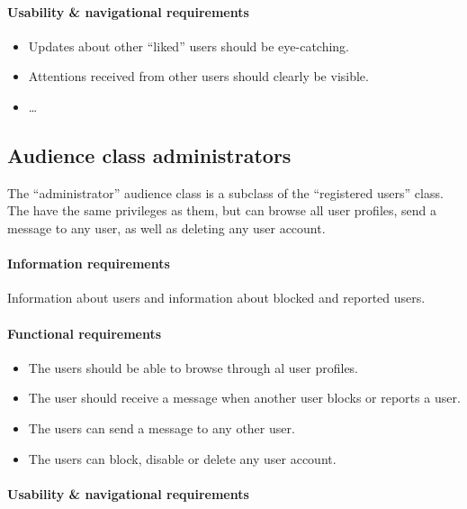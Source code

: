 \documentclass[11pt, a4paper,svglistings,oneside]{book}
\begin{document}
\paragraph{Usability \& navigational requirements}

\begin{itemize}
\item Updates about other ``liked'' users should be eye-catching.
\item Attentions received from other users should clearly be visible.
\item \ldots
\end{itemize}

\subsection{Audience class administrators}

The ``administrator'' audience class is a subclass of the ``registered users'' class. The have the same privileges as them, but can browse all user profiles, send a message to any user, as well as deleting any user account.

\paragraph{Information requirements}

Information about users and information about blocked and reported users.

\paragraph{Functional requirements}

\begin{itemize}
\item The users should be able to browse through al user profiles.
\item The user should receive a message when another user blocks or reports a user.
\item The users can send a message to any other user.
\item The users can block, disable or delete any user account.
\end{itemize}

\paragraph{Usability \& navigational requirements}
\end{document}
